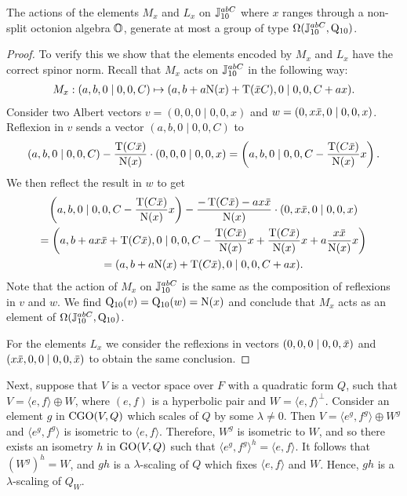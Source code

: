 \begin{proposition}
	The actions of the elements $M_x$ and $L_x$ on $\mathbb{J}_{10}^{abC}$ where $x$ ranges through
	a non-split octonion algebra $\mathbb{O}$, generate at most a group of type $\Omega( \mathbb{J}_{10}^{abC},
	 \mathord{\mathrm{Q}}_{10} )$.
\end{proposition}

\begin{proof}
	To verify this we show that the elements encoded by $M_x$ and $L_x$ have the correct spinor
	norm. Recall that $M_x$ acts on $\mathbb{J}_{10}^{abC}$ in the following way:
	\begin{equation*}
		\begin{array}{r@{\;}c@{\;}l}
		M_x: (a,b,0\mid 0,0,C) & \mapsto & (a,b+a\NN(x)+\Tr(\ovx C),0 \mid 
										0, 0, C+ax).
		\end{array}
	\end{equation*}
	Consider two Albert vectors $v = (0,0,0\mid 0,0,x)$ and $w = (0,x \mathord{\mbox{\hspace*{0pt}}\,\overline{\!x\!\!\;}\!\:}\mbox{\hspace*{0pt}}, 0 \mid 0,0, x)$. 
	Reflexion in $v$ sends a vector $(a,b,0\mid 0,0,C)$ to
	\begin{equation*}
		(a,b,0\mid 0,0,C) - \frac{\Tr(C\ovx)}{\NN(x)} \cdot (0,0,0\mid 0,0,x) =
			\left(a,b,0\mid 0,0, C - \frac{\Tr(C\ovx)}{\NN(x)} x\right).
	\end{equation*}
	We then reflect the result in $w$ to get
	\begin{multline*}
		\left(a,b,0\mid 0,0, C - \frac{\Tr(C\ovx)}{\NN(x)} x\right) - 
			\frac{-\Tr(C\ovx) - a x \ovx}{\NN(x)} \cdot (0,x\ovx,0\mid 0,0,x) \\
		= \left(a, b+ax\ovx + \Tr(C\ovx), 0 \mid 0,0, C - \frac{\Tr(C\ovx)}{\NN(x)}x + 
		\frac{\Tr(C\ovx)}{\NN(x)} x + a \frac{ x\ovx }{\NN(x)} x \right) \\
		= (a, b+a\NN(x)+\Tr(C\ovx), 0 \mid 0,0, C + ax).
	\end{multline*}
	Note that the action of $M_x$ on $\mathbb{J}_{10}^{abC}$ is the same as the composition
	of reflexions in $v$ and $w$. We find $\mathord{\mathrm{Q}}_{10}(v) = \mathord{\mathrm{Q}}_{10}(w) = \mathord{\mathrm{N}}(x)$ and conclude that 
	$M_x$ acts as an element of $\Omega(\mathbb{J}_{10}^{abC}, \mathord{\mathrm{Q}}_{10})$. 
	
	For the elements $L_x$ we consider the reflexions in vectors $(0,0,0\mid 0,0,\mathord{\mbox{\hspace*{0pt}}\,\overline{\!x\!\!\;}\!\:}\mbox{\hspace*{0pt}})$ and
	$(x\ovx,0,0\mid 0,0,\ovx)$ to obtain the same conclusion. 
\end{proof}

Next, suppose that $V$ is a vector space over $F$ with a quadratic form $Q$, 
such that $V = \langle e,f \rangle  \oplus W$, where $(e, f)$ is a hyperbolic pair and 
$W = \langle e, f \rangle^{\perp}$. Consider an element $g$ in $\mathrm{CGO}(V,Q)$ which scales of $Q$ 
by some $\lambda \neq 0$. Then
$V = \langle e^g, f^g \rangle \oplus W^g$ and $\langle e^g, f^g \rangle$ is
isometric to $\langle e, f \rangle$. Therefore, $W^g$ is isometric to 
$W$, and so there exists an isometry $h$ in $\mathrm{GO}(V,Q)$ such that 
$\langle e^g, f^g \rangle^h = \langle e, f \rangle$. It follows that 
$(W^g)^h = W$, and $gh$ is a $\lambda$-scaling of $Q$ which fixes
$\langle e, f \rangle$ and $W$. Hence, $gh$ is a $\lambda$-scaling of $Q_W$. 

